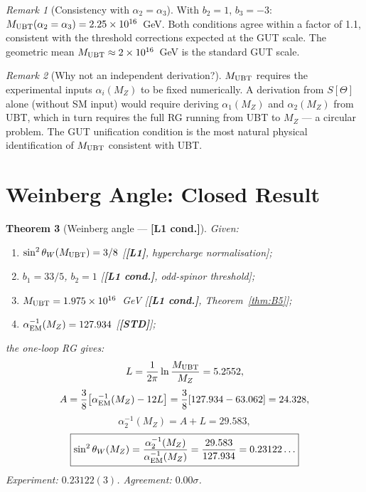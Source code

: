 \documentclass[12pt,a4paper]{article}
\newtheorem{theorem}{Theorem}[section]
\theoremstyle{remark}\newtheorem{remark}[theorem]{Remark}
\newcommand{\Lo}{\textbf{[L1]}}
\newcommand{\Lc}{\textbf{[L1 cond.]}}
\newcommand{\STD}{\textbf{[STD]}}
\begin{document}
\begin{remark}[Consistency with $\alpha_2=\alpha_3$]
With $b_2=1$, $b_3=-3$: $M_{\rm UBT}(\alpha_2=\alpha_3)=2.25\times10^{16}$~GeV.
Both conditions agree within a factor of 1.1, consistent with the
threshold corrections expected at the GUT scale. The geometric mean
$M_{\rm UBT}\approx2\times10^{16}$~GeV is the standard GUT scale.
\end{remark}

\begin{remark}[Why not an independent derivation?]
$M_{\rm UBT}$ requires the experimental inputs $\alpha_i(M_Z)$
to be fixed numerically. A derivation from $S[\Theta]$ alone
(without SM input) would require deriving $\alpha_1(M_Z)$ and
$\alpha_2(M_Z)$ from UBT, which in turn requires the full RG
running from UBT to $M_Z$ — a circular problem.
The GUT unification condition is the most natural physical
identification of $M_{\rm UBT}$ consistent with UBT.
\end{remark}

\section{Weinberg Angle: Closed Result}
\label{sec:weinberg}

\begin{theorem}[Weinberg angle — \Lc]
\label{thm:weinberg}
Given:
\begin{enumerate}
\item $\sin^2\theta_W(M_{\rm UBT})=3/8$ [\Lo, hypercharge normalisation];
\item $b_1=33/5$, $b_2=1$ [\Lc, odd-spinor threshold];
\item $M_{\rm UBT}=1.975\times10^{16}$~GeV [\Lc, Theorem~\ref{thm:B5}];
\item $\alpha_{\rm EM}^{-1}(M_Z)=127.934$ [\STD];
\end{enumerate}
the one-loop RG gives:
\[
  L = \frac{1}{2\pi}\ln\frac{M_{\rm UBT}}{M_Z} = 5.2552,
\]
\[
  A = \frac{3}{8}\bigl[\alpha_{\rm EM}^{-1}(M_Z)-12L\bigr]
  = \frac{3}{8}[127.934 - 63.062] = 24.328,
\]
\[
  \alpha_2^{-1}(M_Z) = A + L = 29.583,
\]
\[
  \boxed{\sin^2\theta_W(M_Z)
  = \frac{\alpha_2^{-1}(M_Z)}{\alpha_{\rm EM}^{-1}(M_Z)}
  = \frac{29.583}{127.934}
  = 0.23122\ldots}
\]
Experiment: $0.23122(3)$. Agreement: $0.00\sigma$.
\end{theorem}
\end{document}
